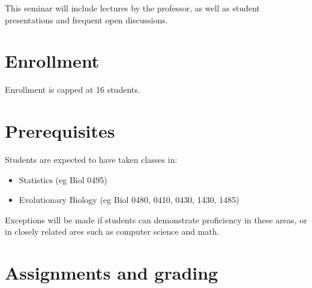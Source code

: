 \documentclass[12pt]{article}
\begin{document}
This seminar will include lectures by the professor, as well as student presentations and frequent open discussions.

\section*{Enrollment}
Enrollment is capped at 16 students.


\section*{Prerequisites} 
Students are expected to have taken classes in:

\begin{itemize}


\item Statistics (eg Biol 0495)
\item Evolutionary Biology (eg Biol 0480, 0410, 0430,  1430, 1485)

\end{itemize}

Exceptions will be made if students can demonstrate proficiency in these areas, or in closely related ares such as computer science and math.

\section*{Assignments and grading}
\end{document}
